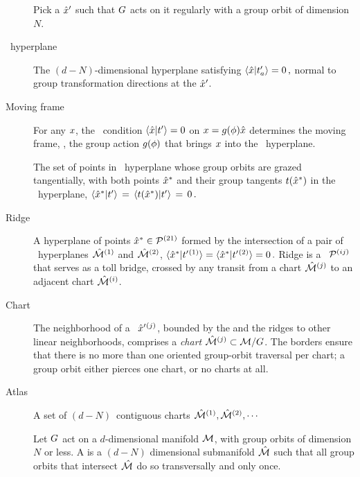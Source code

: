 \documentclass[aip,cha,reprint,
secnumarabic,
nofootinbib, tightenlines,
nobibnotes, showkeys, showpacs,
groupedaddress
]{revtex4-1}
\begin{document}
\begin{description}

\item[\Template]
Pick a {\template} ${\hat{x}'}$ such that $G$ acts on it
regularly with a group orbit of dimension $N$.

\item[\Slice\ hyperplane]
The $(d\!-\!N)$-dimensional hyperplane satisfying
\( %
\braket{\sspRed}{\sliceTan{a}}=0
\,,
\) %
normal to group transformation directions at the {\template} ${\hat{x}'}$.

\item[Moving frame]
For any $x$, the \slice\ condition $\braket{\sspRed}{\sliceTan{}}=0$
on $x = g({\bf \phi})\hat{x}$ determines the moving frame, \ie, the
group action $g({\bf \phi})$ that brings $ x$ into the \slice\
hyperplane.

\item[\ChartBord]
The set of points in \slice\ hyperplane whose group orbits are grazed
tangentially, with both points $\hat{x}^\ast$ and their group tangents
$t(\hat{x}^\ast)$  in the \slice\ hyperplane,
$\braket{\sspRSing}{\sliceTan{}} \,=\,
\braket{\groupTan(\sspRSing)}{\sliceTan{}} \,=\, 0 \,.$

\item[Ridge]
A hyperplane of points $\hat{x}^* \in {\cal P}{}^{(21)}$ formed by the
intersection of a pair of \slice\ hyperplanes $\hat{\cal M}{}^{(1)}$ and
$\hat{\cal M}{}^{(2)}$,
\(
\braket{\sspRed^*}{\sliceTan{}{}^{(1)}} =
\braket{\sspRed^*}{\sliceTan{}{}^{(2)}} = 0
    \,.
\) %
Ridge is a \PoincSec\ ${\cal P}{}^{(ij)}$ that serves as a toll bridge,
crossed by any transit from a chart $\hat{\cal M}{}^{(j)}$ to an adjacent chart
$\hat{\cal M}{}^{(i)}$.

\item[Chart]
The neighborhood of a \template\ ${\hat{x}'}{}^{(j)}$, bounded by the
{\chartBord} and the ridges to other linear neighborhoods, comprises
a \emph{chart} $\hat{\cal M}{}^{(j)} \subset {\cal M}/G$. The borders ensure
that there is no more than one oriented group-orbit traversal per chart;
a group orbit either pierces one chart, or no charts at all.

\item[Atlas]
A set of $(d\!-\!N)$\dmn\ contiguous charts $\hat{\cal M}{}^{(1)},
\hat{\cal M}{}^{(2)}, \cdots$

\item[\Slice]
Let $G$ act on a $d$-dimensional manifold ${\cal M}$, with group
orbits of dimension $N$ or less. A \emph{\slice} is a $(d\!-\!N)$
dimensional submanifold $\hat{\cal M}$ such that all group orbits that
intersect $\hat{\cal M}$ do so transversally and only once.

\end{description}
\end{document}

